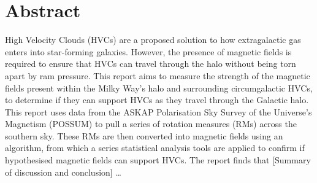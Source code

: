 \chapter*{Abstract}
\vspace{-1em}

High Velocity Clouds (HVCs) are a proposed solution to how extragalactic gas enters into star-forming galaxies. However, the presence of magnetic fields is required to ensure that HVCs can travel through the halo without being torn apart by ram pressure. This report aims to measure the strength of the magnetic fields present within the Milky Way’s halo and surrounding circumgalactic HVCs, to determine if they can support HVCs as they travel through the Galactic halo. This report uses data from the ASKAP Polarisation Sky Survey of the Universe’s Magnetism (POSSUM) to pull a series of rotation measures (RMs) across the southern sky. These RMs are then converted into magnetic fields using an algorithm, from which a series statistical analysis tools are applied to confirm if hypothesised magnetic fields can support HVCs. The report finds that [Summary of discussion and conclusion] …


